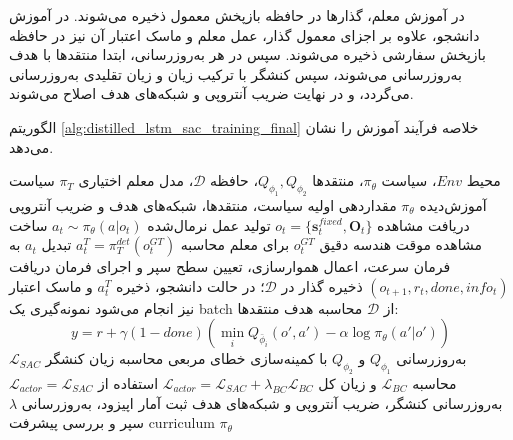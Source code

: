 در آموزش معلم، گذارها در حافظه بازپخش معمول  ذخیره می‌شوند. در آموزش دانشجو، علاوه بر اجزای معمول گذار، عمل معلم و ماسک اعتبار آن نیز در حافظه بازپخش سفارشی ذخیره می‌شوند. سپس در هر به‌روزرسانی، ابتدا منتقدها با هدف  به‌روزرسانی می‌شوند، سپس کنشگر با ترکیب زیان  و زیان تقلیدی به‌روزرسانی می‌گردد، و در نهایت ضریب آنتروپی و شبکه‌های هدف اصلاح می‌شوند.

الگوریتم \ref{alg:distilled_lstm_sac_training_final} خلاصه فرآیند آموزش را نشان می‌دهد.

\begin{algorithm}[ht]
	\footnotesize
	\caption{فرآیند آموزش عامل  با سپر غیرفعال و لنگر رفتاری معلم}
	\label{alg:distilled_lstm_sac_training_final}
	\begin{algorithmic}[1]
		\REQUIRE محیط \(Env\)، سیاست \(\pi_\theta\)، منتقدها \(Q_{\phi_1},Q_{\phi_2}\)، حافظه \(\mathcal{D}\)، مدل معلم اختیاری \(\pi_T\)
		\ENSURE سیاست آموزش‌دیده \(\pi_\theta\)
		\STATE مقداردهی اولیه سیاست، منتقدها، شبکه‌های هدف و ضریب آنتروپی
		\STATE دریافت مشاهده \(o_t=\{\mathbf{s}^{fixed}_t,\mathbf{O}_t\}\)
		\STATE تولید عمل نرمال‌شده \(a_t\sim\pi_\theta(a|o_t)\)
		\STATE ساخت مشاهده موقت هندسه دقیق \(o^{GT}_t\) برای معلم
		\STATE محاسبه \(a^T_t=\pi_T^{det}(o^{GT}_t)\)
		\ENDIF
		\STATE تبدیل \(a_t\) به فرمان سرعت، اعمال هموارسازی، تعیین سطح سپر و اجرای فرمان
		\STATE دریافت \((o_{t+1},r_t,done,info_t)\)
		\STATE ذخیره گذار در \(\mathcal{D}\)؛ در حالت دانشجو، ذخیره \(a^T_t\) و ماسک اعتبار نیز انجام می‌شود
		\STATE نمونه‌گیری یک batch از \(\mathcal{D}\)
		\STATE محاسبه هدف منتقدها:
		\[
		y=r+\gamma(1-done)
		\left(
		\min_i Q_{\bar{\phi}_i}(o',a')-
		\alpha\log\pi_\theta(a'|o')
		\right)
		\]
		\STATE به‌روزرسانی \(Q_{\phi_1}\) و \(Q_{\phi_2}\) با کمینه‌سازی خطای مربعی
		\STATE محاسبه زیان کنشگر \(\mathcal{L}_{SAC}\)
		\STATE محاسبه \(\mathcal{L}_{BC}\) و زیان کل \(\mathcal{L}_{actor}=\mathcal{L}_{SAC}+\lambda_{BC}\mathcal{L}_{BC}\)
		\ELSE
		\STATE استفاده از \(\mathcal{L}_{actor}=\mathcal{L}_{SAC}\)
		\ENDIF
		\STATE به‌روزرسانی کنشگر، ضریب آنتروپی و شبکه‌های هدف
		\ENDIF
		\STATE ثبت آمار اپیزود، به‌روزرسانی \(\lambda\) سپر و بررسی پیشرفت curriculum
		\ENDIF
		\ENDFOR
		\RETURN \(\pi_\theta\)
	\end{algorithmic}
\end{algorithm}

